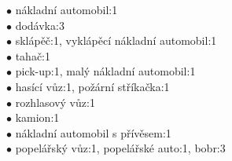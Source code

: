 \begin{figure}
{{\begin{multicols}{2}
\vspace{0.5cm}

\hspace*{0cm}$\bullet$ nákladní automobil:1\\
\hspace*{1cm}$\bullet$ dodávka:3\\
\hspace*{1cm}$\bullet$ sklápěč:1, vyklápěcí nákladní automobil:1\\
\hspace*{1cm}$\bullet$ tahač:1\\
\hspace*{1cm}$\bullet$ pick-up:1, malý nákladní automobil:1\\
\hspace*{1cm}$\bullet$ hasící vůz:1, požární stříkačka:1\\
\hspace*{1cm}$\bullet$ rozhlasový vůz:1\\
\hspace*{1cm}$\bullet$ kamion:1\\
\hspace*{1cm}$\bullet$ nákladní automobil s přívěsem:1\\
\hspace*{1cm}$\bullet$ popelářský vůz:1, popelářské auto:1, bobr:3\\

\columnbreak


\end{multicols}}}
\end{figure}
